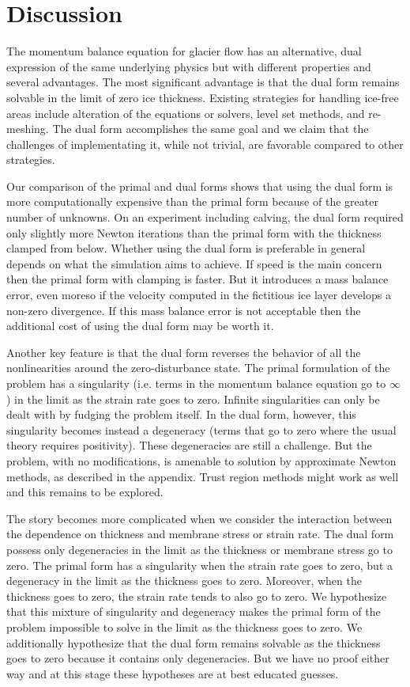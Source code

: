 \documentclass[review,oneside]{igs}
\begin{document}
\section{Discussion}

The momentum balance equation for glacier flow has an alternative, dual expression of the same underlying physics but with different properties and several advantages.
The most significant advantage is that the dual form remains solvable in the limit of zero ice thickness.
Existing strategies for handling ice-free areas include alteration of the equations or solvers, level set methods, and re-meshing.
The dual form accomplishes the same goal and we claim that the challenges of implementating it, while not trivial, are favorable compared to other strategies.

Our comparison of the primal and dual forms shows that using the dual form is more computationally expensive than the primal form because of the greater number of unknowns.
On an experiment including calving, the dual form required only slightly more Newton iterations than the primal form with the thickness clamped from below.
Whether using the dual form is preferable in general depends on what the simulation aims to achieve.
If speed is the main concern then the primal form with clamping is faster.
But it introduces a mass balance error, even moreso if the velocity computed in the fictitious ice layer develops a non-zero divergence.
If this mass balance error is not acceptable then the additional cost of using the dual form may be worth it.

Another key feature is that the dual form reverses the behavior of all the nonlinearities around the zero-disturbance state.
The primal formulation of the problem has a singularity (i.e. terms in the momentum balance equation go to $\infty$) in the limit as the strain rate goes to zero.
Infinite singularities can only be dealt with by fudging the problem itself.
In the dual form, however, this singularity becomes instead a degeneracy (terms that go to zero where the usual theory requires positivity).
These degeneracies are still a challenge.
But the problem, with no modifications, is amenable to solution by approximate Newton methods, as described in the appendix.
Trust region methods \citep{nocedal2006numerical} might work as well and this remains to be explored.

The story becomes more complicated when we consider the interaction between the dependence on thickness and membrane stress or strain rate.
The dual form possess only degeneracies in the limit as the thickness or membrane stress go to zero.
The primal form has a singularity when the strain rate goes to zero, but a degeneracy in the limit as the thickness goes to zero.
Moreover, when the thickness goes to zero, the strain rate tends to also go to zero.
We hypothesize that this mixture of singularity and degeneracy makes the primal form of the problem impossible to solve in the limit as the thickness goes to zero.
We additionally hypothesize that the dual form remains solvable as the thickness goes to zero because it contains only degeneracies.
But we have no proof either way and at this stage these hypotheses are at best educated guesses.
\end{document}
